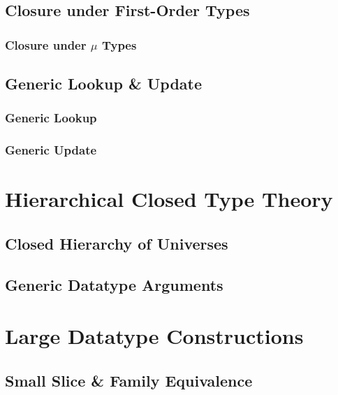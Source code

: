 \documentclass[12pt]{report}
\theoremstyle{definition}
\theoremstyle{remark}
\numberwithin{definition}{section}
\numberwithin{equation}{section}
\numberwithin{proposition}{section}
\numberwithin{conjecture}{section}
\numberwithin{theorem}{section}
\numberwithin{lemma}{section}
\numberwithin{corollary}{section}
\numberwithin{example}{section}
\numberwithin{remark}{section}
\begin{document}
\chapter{Closure under First-Order Types}\label{ch:closed}
\section{Closure under $\mu$ Types}
\chapter{Generic Lookup \& Update}\label{ch:gupdate}
\section{Generic Lookup}
\section{Generic Update}



\part{Hierarchical Closed Type Theory}\label{part:hier}

\chapter{Closed Hierarchy of Universes}\label{ch:hier}
\chapter{Generic Datatype Arguments}\label{ch:gargs}


\part{Large Datatype Constructions}\label{part:large}

\chapter{Small Slice \& Family Equivalence}\label{ch:equiv}
\end{document}
